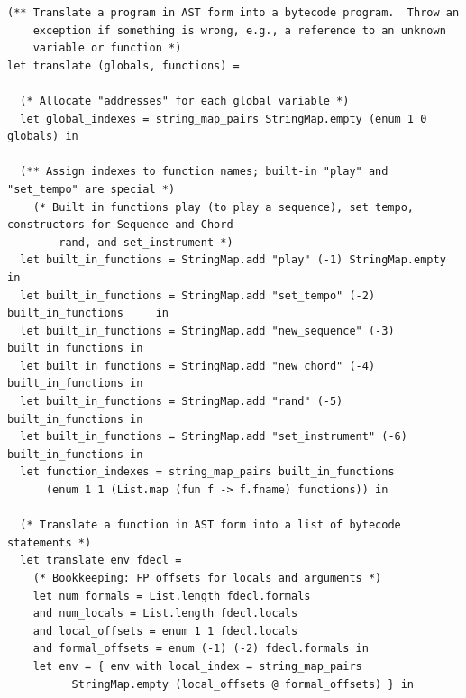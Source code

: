 \documentclass[12pt,A4]{book}
\begin{document}
\begin{verbatim}
(** Translate a program in AST form into a bytecode program.  Throw an
    exception if something is wrong, e.g., a reference to an unknown
    variable or function *)
let translate (globals, functions) =

  (* Allocate "addresses" for each global variable *)
  let global_indexes = string_map_pairs StringMap.empty (enum 1 0 globals) in

  (** Assign indexes to function names; built-in "play" and "set_tempo" are special *)
    (* Built in functions play (to play a sequence), set tempo, constructors for Sequence and Chord
        rand, and set_instrument *)
  let built_in_functions = StringMap.add "play" (-1) StringMap.empty in
  let built_in_functions = StringMap.add "set_tempo" (-2) built_in_functions     in
  let built_in_functions = StringMap.add "new_sequence" (-3) built_in_functions in
  let built_in_functions = StringMap.add "new_chord" (-4) built_in_functions in
  let built_in_functions = StringMap.add "rand" (-5) built_in_functions in
  let built_in_functions = StringMap.add "set_instrument" (-6) built_in_functions in
  let function_indexes = string_map_pairs built_in_functions
      (enum 1 1 (List.map (fun f -> f.fname) functions)) in

  (* Translate a function in AST form into a list of bytecode statements *)
  let translate env fdecl =
    (* Bookkeeping: FP offsets for locals and arguments *)
    let num_formals = List.length fdecl.formals
    and num_locals = List.length fdecl.locals
    and local_offsets = enum 1 1 fdecl.locals
    and formal_offsets = enum (-1) (-2) fdecl.formals in
    let env = { env with local_index = string_map_pairs
		  StringMap.empty (local_offsets @ formal_offsets) } in


\end{verbatim}
\end{document}
